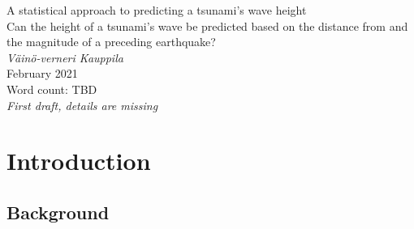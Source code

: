 \documentclass[11pt,letterpaper]{article}
\begin{document}



\begin{titlepage}
    \begin{center}
        \vspace*{4cm}
        A statistical approach to predicting a tsunami’s wave height \\
        \vspace{1cm}
        Can the height of a tsunami's wave be predicted based on the distance from and
        the magnitude of a preceding earthquake? \\
        \vspace{1cm}
        \textit{Väinö-verneri Kauppila} \\
        February 2021 \\
        \vspace{4cm}
        Word count: TBD \\
        \textit{First draft, details are missing}
        \vfill
        \vspace{0.1cm}
    \end{center}
\end{titlepage}



\begin{center}
    \tableofcontents
    \vspace{1in}

\end{center}



\newpage


\section{Introduction}

\subsection{Background}
\end{document}
